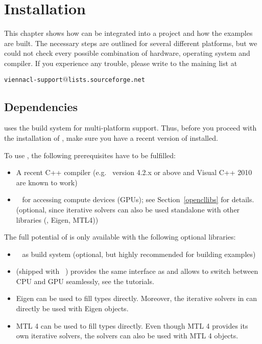 \chapter{Installation}

This chapter shows how {\ViennaCL} can be integrated into a project and how the
examples are built. The necessary steps are outlined for several different
platforms, but we could not check every possible combination of hardware,
operating system and compiler. If you experience any trouble, please write to
the maining list at \\
\begin{center}
\texttt{viennacl-support$@$lists.sourceforge.net} 
\end{center}


\section{Dependencies}
\label{dependencies}
{\ViennaCL} uses the {\CMake} build system for multi-platform support.
Thus, before you proceed with the installation of {\ViennaCL}, make sure you
have a recent version of {\CMake} installed.

To use {\ViennaCL}, the following prerequisites have to be fulfilled:
\begin{itemize}
 \item A recent C++ compiler (e.g.~{\GCC} version 4.2.x or above and Visual C++
2010 are known to work)
 \item {\OpenCL}~\cite{khronoscl,nvidiacl} for accessing compute devices (GPUs);
see Section~\ref{opencllibs} for details.
(optional, since iterative solvers can also be used standalone with other libraries (\ublas, Eigen, MTL4))
\end{itemize}


The full potential of {\ViennaCL} is only available with the following optional libraries:
\begin{itemize}
 \item {\CMake}~\cite{cmake} as build system (optional, but highly recommended for building examples)
 \item {\ublas} (shipped with {\Boost}~\cite{boost}) provides the same interface as {\ViennaCL} and allows to switch between CPU and GPU seamlessly, see the tutorials.
 \item Eigen \cite{eigen} can be used to fill {\ViennaCL} types directly. Moreover, the iterative solvers in {\ViennaCL} can directly be used with Eigen objects.
 \item MTL 4 \cite{mtl4} can be used to fill {\ViennaCL} types directly. Even though MTL 4 provides its own iterative solvers, the {\ViennaCL} solvers can also be used with MTL 4 objects.
\end{itemize}


